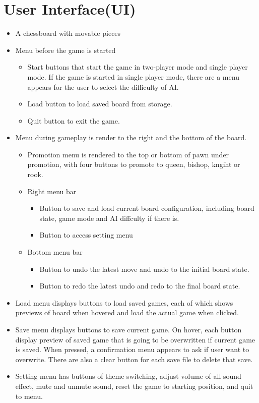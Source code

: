 \documentclass[a4paper, 10pt, titlepage]{report}
\begin{document}
\section{User Interface(UI)}
\begin{itemize}
  \item A chessboard with movable pieces

  \item Menu before the game is started
        \begin{itemize}
          \item Start buttons that start the game in two-player mode and single player mode. If the game is started in single player mode, there are a menu appears for the user to select the difficulty of AI.
          \item Load button to load saved board from storage.
          \item Quit button to exit the game.
        \end{itemize}
  \item Menu during gameplay is render to the right and the bottom of the board.
        \begin{itemize}
          \item Promotion menu is rendered to the top or bottom of pawn under promotion, with four buttons to promote to queen, bishop, kngiht or rook.
          \item Right menu bar

                \begin{itemize}
                  \item Button to save and load current board configuration, including board state, game mode and AI diffculty if there is.
                  \item Button to access setting menu
                \end{itemize}

          \item Bottom menu bar
                \begin{itemize}
                  \item Button to undo the latest move and undo to the initial board state.
                  \item Button to redo the latest undo and redo to the final board state.
                \end{itemize}
        \end{itemize}
  \item Load menu displays buttons to load saved games, each of which shows previews of board when hovered and load the actual game when clicked.
  \item Save menu displays buttons to save current game. On hover, each button display preview of saved game that is going to be overwritten if current game is saved. When pressed, a confirmation menu appears to ask if user want to overwrite. There are also a clear button for each save file to delete that save.
  \item Setting menu has buttons of theme switching, adjust volume of all sound effect, mute and unmute sound, reset the game to starting position, and quit to menu.
\end{itemize}
\end{document}
